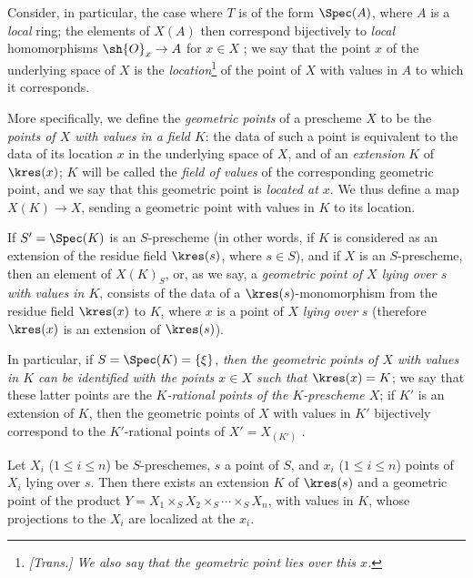 \begin{env}[3.4.5]
\label{I.3.4.5}
Consider, in particular, the case where $T$ is of the form $\Spec(A)$, where $A$ is a
\emph{local} ring; the elements of $X(A)$ then correspond bijectively to \emph{local}
homomorphisms $\sh{O}_x\to A$ for $x\in X$ ; we say that the
point $x$ of the underlying space of $X$ is the \emph{location}\footnote{\emph{[Trans.] We also say that
\emph{the geometric point lies over this $x$}.}} of the point of $X$ with values in $A$ to which it corresponds.

More specifically, we define the \emph{geometric points} of a prescheme $X$ to be the \emph{points of
$X$ with values in a field $K$}: the data of such a point is equivalent to the data of its
location $x$ in the underlying space of $X$, and of an \emph{extension} $K$ of $\kres(x)$;
$K$ will be called the \emph{field of values} of the corresponding geometric point, and we
say that this geometric point is \emph{located at $x$}. We thus define a map $X(K)\to X$,
sending a geometric point with values in $K$ to its location.

If $S'=\Spec(K)$ is an $S$-prescheme (in other words, if $K$ is considered as an extension
of the residue field $\kres(s)$, where $s\in S$), and if $X$ is an $S$-prescheme, then an
element of $X(K)_S$, or, as we say, a \emph{geometric point of $X$ lying over $s$ with values
in $K$}, consists of the data of a $\kres(s)$-monomorphism from the residue field $\kres(x)$
to $K$, where $x$ is a point of $X$ \emph{lying over $s$} (therefore $\kres(x)$ is an
extension of $\kres(s)$).

In particular, if $S=\Spec(K)=\{\xi\}$, \emph{then the geometric points of $X$ with values in
$K$ can be identified with the points $x\in X$ such that $\kres(x)=K$}; we say that these latter
points are the \emph{$K$-rational points of the $K$-prescheme $X$}; if $K'$ is an extension
of $K$, then the geometric points of $X$ with values in $K'$ bijectively correspond to the
$K'$-rational points of $X'=X_{(K')}$ .
\end{env}

\begin{lemma}[3.4.6]
\label{I.3.4.6}
Let $X_i$ ($1\leq i\leq n$) be $S$-preschemes, $s$ a point of $S$, and $x_i$
($1\leq i\leq n$) points of $X_i$ lying over $s$. Then there exists an extension
$K$ of $\kres(s)$ and a geometric point of the product
$Y=X_1\times_S X_2\times_S\cdots\times_S X_n$, with values in $K$, whose projections to
the $X_i$ are localized at the $x_i$.
\end{lemma}

